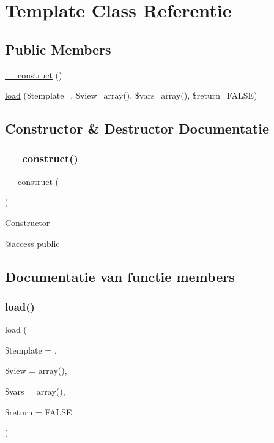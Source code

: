 \hypertarget{class_template}{}\section{Template Class Referentie}
\label{class_template}
\subsection*{Public Members}
\begin{DoxyCompactItemize}
\item 
\mbox{\hyperlink{class_template_a095c5d389db211932136b53f25f39685}{\+\_\+\+\_\+construct}} ()
\item 
\mbox{\hyperlink{class_template_af542aa0eefc6d8a6a3adb2142b02e6eb}{load}} (\$template=\textquotesingle{}\textquotesingle{}, \$view=array(), \$vars=array(), \$return=F\+A\+L\+SE)
\end{DoxyCompactItemize}


\subsection{Constructor \& Destructor Documentatie}
\mbox{\label{class_template_a095c5d389db211932136b53f25f39685}} 
\subsubsection{\texorpdfstring{\_\_construct()}{\_\_construct()}}
{\footnotesize\ttfamily \+\_\+\+\_\+construct (\begin{DoxyParamCaption}{ }\end{DoxyParamCaption})}

Constructor

@access public 

\subsection{Documentatie van functie members}
\mbox{\label{class_template_af542aa0eefc6d8a6a3adb2142b02e6eb}} 
\subsubsection{\texorpdfstring{load()}{load()}}
{\footnotesize\ttfamily load (\begin{DoxyParamCaption}\item[{}]{\$template = {\ttfamily \textquotesingle{}\textquotesingle{}},  }\item[{}]{\$view = {\ttfamily array()},  }\item[{}]{\$vars = {\ttfamily array()},  }\item[{}]{\$return = {\ttfamily FALSE} }\end{DoxyParamCaption})}

